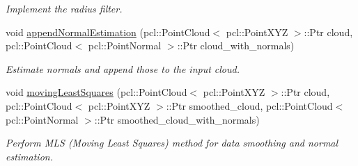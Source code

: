 \begin{DoxyCompactItemize}
\begin{DoxyCompactList}\small\item\em Implement the radius filter. \end{DoxyCompactList}\item 
void \hyperlink{classhull__abstraction_1_1_preprocessor_a9768f4de4320607118636323343b5b5c}{append\+Normal\+Estimation} (pcl\+::\+Point\+Cloud$<$ pcl\+::\+Point\+X\+YZ $>$\+::Ptr cloud, pcl\+::\+Point\+Cloud$<$ pcl\+::\+Point\+Normal $>$\+::Ptr cloud\+\_\+with\+\_\+normals)
\begin{DoxyCompactList}\small\item\em Estimate normals and append those to the input cloud. \end{DoxyCompactList}\item 
void \hyperlink{classhull__abstraction_1_1_preprocessor_adb771d9dfac554a7dd35db7d9acc3ca3}{moving\+Least\+Squares} (pcl\+::\+Point\+Cloud$<$ pcl\+::\+Point\+X\+YZ $>$\+::Ptr cloud, pcl\+::\+Point\+Cloud$<$ pcl\+::\+Point\+X\+YZ $>$\+::Ptr smoothed\+\_\+cloud, pcl\+::\+Point\+Cloud$<$ pcl\+::\+Point\+Normal $>$\+::Ptr smoothed\+\_\+cloud\+\_\+with\+\_\+normals)
\begin{DoxyCompactList}\small\item\em Perform M\+LS (Moving Least Squares) method for data smoothing and normal estimation. \end{DoxyCompactList}\end{DoxyCompactItemize}
